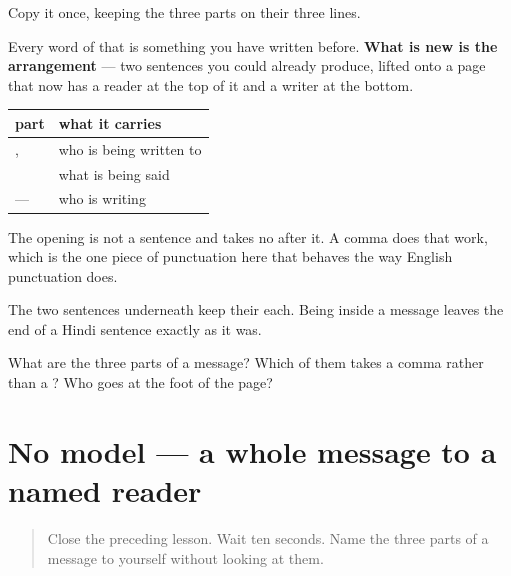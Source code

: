 Copy it once, keeping the three parts on their three lines.

Every word of that is something you have written before. \textbf{What is new is the arrangement} — two sentences you could already produce, lifted onto a page that now has a reader at the top of it and a writer at the bottom.

\begin{grammarlens}[title={Grammar Lens: why the opening earns its own line}]
\noindent
\begin{tabularx}{\linewidth}{@{}>{\raggedright\arraybackslash}X>{\raggedright\arraybackslash}X@{}}
\toprule
\textbf{part} & \textbf{what it carries} \\
\midrule
\hi{प्रिय} \hi{मीरा}, & who is being written to \\
\hi{नमस्ते।} \hi{कल} \hi{मिलते} \hi{हैं।} & what is being said \\
— \hi{अरुण} & who is writing \\
\bottomrule
\end{tabularx}

The opening is not a sentence and takes no \textbf{} after it. A comma does that work, which is the one piece of punctuation here that behaves the way English punctuation does.

The two sentences underneath keep their \textbf{} each. Being inside a message leaves the end of a Hindi sentence exactly as it was.
\end{grammarlens}

\begin{tcolorbox}[breakable,colback=teal!4,colframe=teal!35!black,title={Before you move on}]
What are the three parts of a message? Which of them takes a comma rather than a \textbf{}? Who goes at the foot of the page?
\end{tcolorbox}
\section[\texorpdfstring{\hi{प्रिय} \hi{अरुण}, (priya Aruṇ,)}{प्रिय अरुण, (priya Aruṇ,)}]{No model — a whole message to a named reader}

\label{lesson:HI-C97-sintesis-sandesh}



\begin{quote}
Close the preceding lesson. Wait ten seconds. Name the three parts of a message to yourself without looking at them.
\end{quote}

